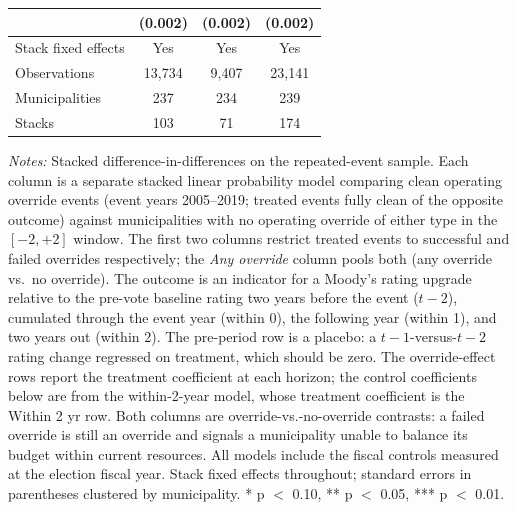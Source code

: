 \begin{table}[!htbp]
\begin{tabular}{lccc}
 & (0.002) & (0.002) & (0.002) \\
\midrule
Stack fixed effects & Yes & Yes & Yes \\
Observations & 13,734 & 9,407 & 23,141 \\
Municipalities & 237 & 234 & 239 \\
Stacks & 103 & 71 & 174 \\
\bottomrule
\end{tabular}
\vspace{0.05in}
\begin{minipage}{0.96\textwidth}\footnotesize\emph{Notes:} Stacked difference-in-differences on the repeated-event sample. Each column is a separate stacked linear probability model comparing clean operating override events (event years 2005--2019; treated events fully clean of the opposite outcome) against municipalities with no operating override of either type in the $[-2,+2]$ window. The first two columns restrict treated events to successful and failed overrides respectively; the \emph{Any override} column pools both (any override vs.\ no override). The outcome is an indicator for a Moody's rating upgrade relative to the pre-vote baseline rating two years before the event ($t-2$), cumulated through the event year (within 0), the following year (within 1), and two years out (within 2). The pre-period row is a placebo: a $t-1$-versus-$t-2$ rating change regressed on treatment, which should be zero. The override-effect rows report the treatment coefficient at each horizon; the control coefficients below are from the within-2-year model, whose treatment coefficient is the Within 2 yr row. Both columns are override-vs.-no-override contrasts: a failed override is still an override and signals a municipality unable to balance its budget within current resources. All models include the fiscal controls measured at the election fiscal year. Stack fixed effects throughout; standard errors in parentheses clustered by municipality. * p $<$ 0.10, ** p $<$ 0.05, *** p $<$ 0.01.\end{minipage}
\end{table}
